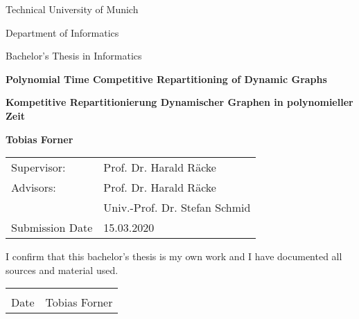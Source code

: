 \documentclass[xcolor=dvipsnames, tikz, 12pt]{article}
\newcommand{\nl}{\newline}
\theoremstyle{definition}
\begin{document}
	\begin{titlepage}
		\begin{center}
			\vspace*{1cm}
			
			\large
			Technical University of Munich\\
			\vspace*{1cm}
			
			Department of Informatics\\
			\vspace*{1cm}
			
			Bachelor's Thesis in Informatics\\
			\vspace*{1cm}
			
			\Huge
			\textbf{Polynomial Time Competitive Repartitioning of Dynamic Graphs}\\
			
			\vspace{1.5cm}
			
			\textbf{Kompetitive Repartitionierung Dynamischer Graphen in polynomieller Zeit}
			
			\vspace{2cm}
			
			\Large
			\textbf{Tobias Forner}
			
			\vspace{2cm}
			
			\large
			\begin{tabular}{l l}
				Supervisor: & Prof. Dr. Harald R\"acke\\
				Advisors: & Prof. Dr. Harald Räcke\\
				${}$ & Univ.-Prof. Dr. Stefan Schmid\\
				Submission Date & 15.03.2020
			\end{tabular}
			
			\vfill
			
		\end{center}
	\end{titlepage}
	
	
	\thispagestyle{empty}
	\noindent I confirm that this bachelor's thesis is my own work and I have documented all sources and material used.\nl\nl
	\begin{center}
		\noindent\begin{tabular}{cc}
			\makebox[2.5in]{\hrulefill} & \makebox[2.5in]{\hrulefill}\\
			Date &	Tobias Forner
			
		\end{tabular}
		
	\end{center}
	
\end{document}
